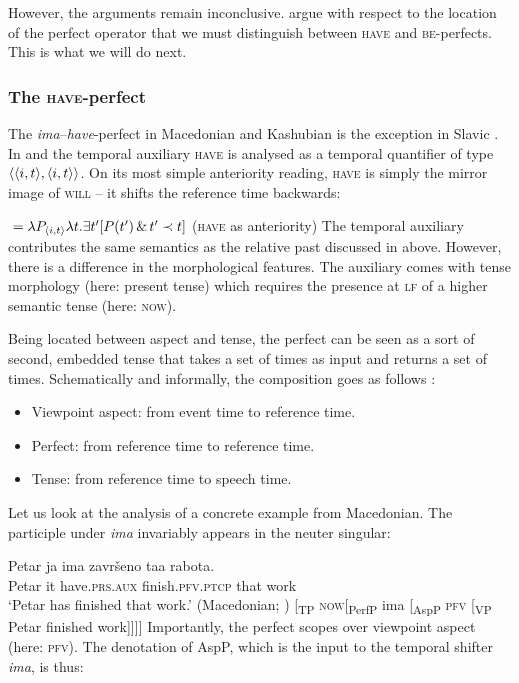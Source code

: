 \documentclass[output=paper,colorlinks,citecolor=brown]{langscibook}
\begin{document}
However, the arguments remain inconclusive. \citet{iatridou01} argue with respect to the location of the perfect operator that we must distinguish between \textsc{have} and \textsc{be}-perfects. This is what we will do next.   

\subsubsection{The \textsc{have}-perfect}

The {\textit{ima}}--\textit{have}-perfect in Macedonian and Kashubian  is the exception in Slavic \citep{Migdalski2006}. In \citet{iatridou01} and \citet{gronn_stechow2020} the temporal  auxiliary \textsc{have} is analysed as a temporal quantifier of type $\langle{\langle{i,t}\rangle,\langle{i,t}\rangle}\rangle$. On its most simple anteriority reading,  \textsc{have}
is simply the mirror image of \textsc{will} -- it shifts the reference time backwards:


\ea\label{im}   ${}=\lambda P_{\langle{i,t}\rangle} \lambda t. \exists t' [ P(t') \, \& \, t' \prec t]$ \hfill    (\textsc{have} as anteriority) 
\z
The temporal auxiliary contributes  the same semantics as the
relative past discussed in  above. However, there is a difference in the morphological features. The auxiliary comes with tense morphology (here: present tense) which requires the presence at \textsc{lf} of a higher semantic tense (here: \textsc{now}).

Being located between aspect and tense, the perfect can be seen as a sort of second, embedded tense \citep{iatridou01} that takes a set of times as input and returns a set of times. Schematically and informally, the composition goes as follows \citep[285]{pancheva03}:

\begin{itemize}
\item Viewpoint aspect: from event time to  reference time.
\item Perfect: from  reference time to  reference time.
\item  Tense: from  reference time to  speech time. 
\end{itemize}


Let us look at the analysis of a concrete example from Macedonian. The participle under \textit{ima} invariably appears in the neuter singular:

\largerpage
\ea\ea\label{mac}\gll Petar ja ima završeno taa rabota.\\
Petar it have.\textsc{prs}.\textsc{aux} finish.\textsc{pfv}.\textsc{ptcp} that work \\
\glt
`Petar has finished that work.' \hfill (Macedonian; \cite[129]{Migdalski2006})
\ex
{[}{\textsubscript{TP}} \textsc{now}[{\textsubscript{PerfP}} ima [{\textsubscript{AspP}} \textsc{pfv} [{\textsubscript{VP}} Petar finished work]]]] 
\z\z
Importantly, the perfect scopes over viewpoint aspect (here: \textsc{pfv}).
The denotation of AspP, which is the input to the temporal shifter {\textit{ima}}, is thus:
\end{document}

